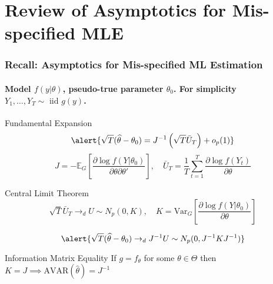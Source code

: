 \section{Review of Asymptotics for Mis-specified MLE}
\begin{frame}
  \frametitle{Recall: Asymptotics for Mis-specified ML Estimation}
  \framesubtitle{Model $f(y|\theta)$, pseudo-true parameter $\theta_0$. For simplicity $Y_1, \dots, Y_T \sim \mbox{ iid } g(y)$.}

  \pause

  \begin{block}{Fundamental Expansion}
    \vspace{-1.5em}
  \[
    \alert{\sqrt{T} ( \widehat{\theta} - \theta_0)   = J^{-1}\left(\sqrt{T} \bar{U}_T\right) + o_p(1)}
  \]
  \footnotesize
\[
      J = -\mathbb{E}_G \left[ \frac{\partial \log f(Y|\theta_0)}{\partial \theta \partial \theta'} \right], \quad
      \bar{U}_T =\frac{1}{T} \sum_{t=1}^T \frac{\partial \log f(Y_t)}{\partial \theta}
\] 
\end{block}

\normalsize

\vspace{-1em}

\pause

\begin{block}{Central Limit Theorem}
  \vspace{-1em}
  \footnotesize
  \[
    \sqrt{T} \bar{U}_T \rightarrow_d U \sim N_p(0, K), \quad
    K = \text{Var}_G\left[\frac{\partial \log f(Y|\theta_0)}{\partial \theta}\right]
  \] 
  \normalsize

  \vspace{-1em}

  \[
    \alert{\sqrt{T}(\widehat{\theta} - \theta_0) \rightarrow_d J^{-1}U \sim N_p(0, J^{-1}KJ^{-1})}
  \]
\end{block}

\vspace{-1em}

\pause

\begin{block}{Information Matrix Equality}
  If $g = f_\theta$ for some $\theta \in \Theta$ then $K = J \implies \text{AVAR}(\widehat{\theta}) = J^{-1}$
\end{block}

\end{frame}

